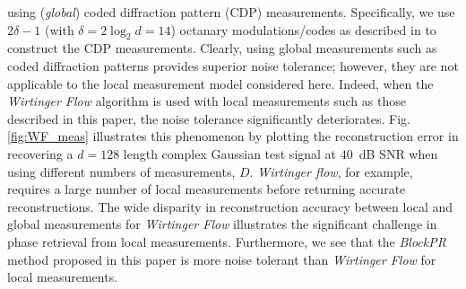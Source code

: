 using ({\em global}) coded diffraction pattern (CDP) measurements. Specifically, we use $2\delta-1$
(with $\delta = 2\log_2d = 14$) octanary modulations/codes as described in \cite[\S 1.5,
(1.9)]{Candes2014WF} to construct the CDP measurements. Clearly, using global measurements such as
coded diffraction patterns provides superior noise tolerance; however, they are not applicable to
the local measurement model considered here.  Indeed, when the {\em Wirtinger Flow} algorithm is
used with local measurements such as those described in this paper, the noise tolerance
significantly deteriorates. Fig. \ref{fig:WF_meas} illustrates this phenomenon by plotting the
reconstruction error in recovering a $d=128$ length complex Gaussian test signal at $40$~dB SNR when
using different numbers of measurements, $D$. {\em Wirtinger flow}, for example, requires a large
number of local measurements before returning accurate reconstructions. 
The wide disparity in reconstruction accuracy between local and global measurements for {\em
Wirtinger Flow} illustrates the significant challenge in phase retrieval from local measurements.
Furthermore, we see that the {\em BlockPR} method proposed in this paper is more noise tolerant than
{\em Wirtinger Flow} for local measurements.
%
